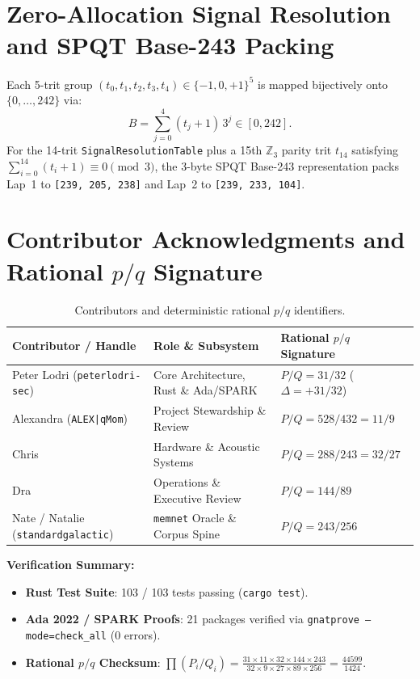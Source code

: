 \documentclass[11pt,a4paper]{article}
\begin{document}
\section{Zero-Allocation Signal Resolution and SPQT Base-243 Packing}

Each 5-trit group $(t_0, t_1, t_2, t_3, t_4) \in \{-1, 0, +1\}^5$ is mapped bijectively onto $\{0, \dots, 242\}$ via:
\[
  B = \sum_{j=0}^{4} (t_j + 1) \, 3^j \in [0, 242].
\]
For the 14-trit \texttt{SignalResolutionTable} plus a 15th $\mathbb{Z}_3$ parity trit $t_{14}$ satisfying $\sum_{i=0}^{14} (t_i + 1) \equiv 0 \pmod{3}$, the 3-byte SPQT Base-243 representation packs Lap~1 to \texttt{[239, 205, 238]} and Lap~2 to \texttt{[239, 233, 104]}.

\section{Contributor Acknowledgments and Rational $p/q$ Signature}

\begin{table}[h]
\centering
\begin{tabular}{lll}
\toprule
\textbf{Contributor / Handle} & \textbf{Role \& Subsystem} & \textbf{Rational $p/q$ Signature} \\
\midrule
Peter Lodri (\texttt{peterlodri-sec}) & Core Architecture, Rust \& Ada/SPARK & $P/Q = 31/32$ ($\Delta = +31/32$) \\
Alexandra (\texttt{ALEX|qMom}) & Project Stewardship \& Review & $P/Q = 528/432 = 11/9$ \\
Chris & Hardware \& Acoustic Systems & $P/Q = 288/243 = 32/27$ \\
Dra & Operations \& Executive Review & $P/Q = 144/89$ \\
Nate / Natalie (\texttt{standardgalactic}) & \texttt{memnet} Oracle \& Corpus Spine & $P/Q = 243/256$ \\
\bottomrule
\end{tabular}
\caption{Contributors and deterministic rational $p/q$ identifiers.}
\end{table}

\noindent\textbf{Verification Summary:}
\begin{itemize}
  \item \textbf{Rust Test Suite}: 103 / 103 tests passing (\texttt{cargo test}).
  \item \textbf{Ada 2022 / SPARK Proofs}: 21 packages verified via \texttt{gnatprove --mode=check\_all} (0 errors).
  \item \textbf{Rational $p/q$ Checksum}: $\prod (P_i / Q_i) = \frac{31 \times 11 \times 32 \times 144 \times 243}{32 \times 9 \times 27 \times 89 \times 256} = \frac{44599}{1424}$.
\end{itemize}
\end{document}
